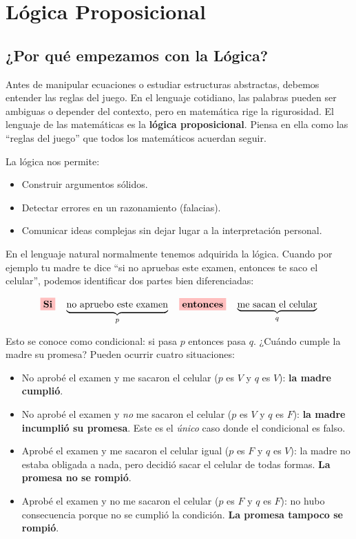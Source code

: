\chapter{Lógica Proposicional}

\section{¿Por qué empezamos con la Lógica?}

Antes de manipular ecuaciones o estudiar estructuras abstractas, debemos entender las reglas del juego. En el lenguaje cotidiano, las palabras pueden ser ambiguas o depender del contexto, pero en matemática rige la rigurosidad. El lenguaje de las matemáticas es la \textbf{lógica proposicional}. Piensa en ella como las ``reglas del juego'' que todos los matemáticos acuerdan seguir.

La lógica nos permite:
\begin{itemize}
    \item Construir argumentos sólidos.
    \item Detectar errores en un razonamiento (falacias).
    \item Comunicar ideas complejas sin dejar lugar a la interpretación personal.
\end{itemize}

En el lenguaje natural normalmente tenemos adquirida la lógica. Cuando por ejemplo tu madre te dice ``si no apruebas este examen, entonces te saco el celular'', podemos identificar dos partes bien diferenciadas:

\[
\colorbox{red!25}{\textbf{Si}}
\quad
\underbrace{\text{no apruebo este examen}}_{p}
\quad
\colorbox{red!25}{\textbf{entonces}}
\quad
\underbrace{\text{me sacan el celular}}_{q}
\]

\noindent
Esto se conoce como condicional: si pasa $p$ entonces pasa $q$. ¿Cuándo cumple la madre su promesa? Pueden ocurrir cuatro situaciones:

\begin{itemize}
    \item No aprobé el examen y me sacaron el celular ($p$ es $V$ y $q$ es $V$): \textbf{la madre cumplió}.

    \item No aprobé el examen y \emph{no} me sacaron el celular ($p$ es $V$ y $q$ es $F$): \textbf{la madre incumplió su promesa}. Este es el \emph{único} caso donde el condicional es falso.

    \item Aprobé el examen y me sacaron el celular igual ($p$ es $F$ y $q$ es $V$): la madre no estaba obligada a nada, pero decidió sacar el celular de todas formas. \textbf{La promesa no se rompió}.

    \item Aprobé el examen y no me sacaron el celular ($p$ es $F$ y $q$ es $F$): no hubo consecuencia porque no se cumplió la condición. \textbf{La promesa tampoco se rompió}.
\end{itemize}

